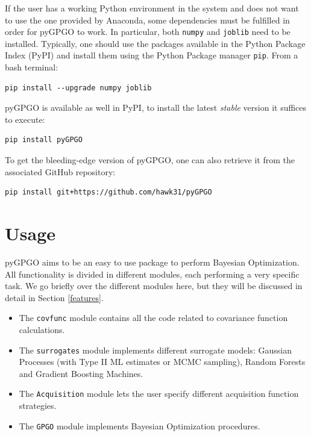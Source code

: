 \documentclass[10pt,a4paper,twoside]{book}
\begin{document}
If the user has a working Python environment in the system and does not want to use the one provided by Anaconda, some dependencies must be fulfilled in order for pyGPGO to work. In particular, both \texttt{numpy} and \texttt{joblib} need to be installed. Typically, one should use the packages available in the Python Package Index (PyPI) and install them using the Python Package manager \texttt{pip}. From a bash terminal:

\begin{verbatim}
pip install --upgrade numpy joblib            
\end{verbatim}

pyGPGO is available as well in PyPI, to install the latest \textit{stable} version it suffices to execute:
 
\begin{verbatim}
pip install pyGPGO           
\end{verbatim}

To get the bleeding-edge version of pyGPGO, one can also retrieve it from the associated GitHub repository:

\begin{verbatim}
pip install git+https://github.com/hawk31/pyGPGO          
\end{verbatim}

\section{Usage}

pyGPGO aims to be an easy to use package to perform Bayesian Optimization. All functionality is divided in different modules, each performing a very specific task. We go briefly over the different modules here, but they will be discussed in detail in Section \ref{features}.

\begin{itemize}
\item The \texttt{covfunc} module contains all the code related to covariance function calculations. 
\item The \texttt{surrogates} module implements different surrogate models: Gaussian Processes (with Type II ML estimates or MCMC sampling), Random Forests and Gradient Boosting Machines.
\item The \texttt{Acquisition} module lets the user specify different acquisition function strategies.
\item The \texttt{GPGO} module implements Bayesian Optimization procedures. 
\end{itemize}
\end{document}
